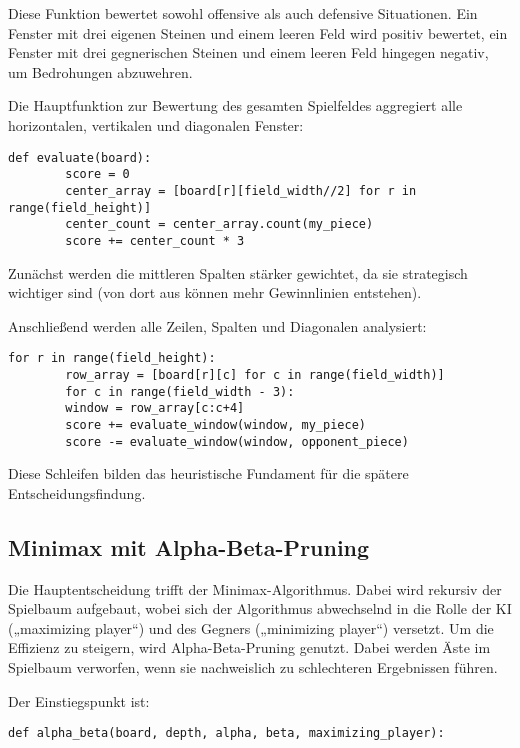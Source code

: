 	Diese Funktion bewertet sowohl offensive als auch defensive Situationen. Ein Fenster mit drei eigenen Steinen und einem leeren Feld wird positiv bewertet, ein Fenster mit drei gegnerischen Steinen und einem leeren Feld hingegen negativ, um Bedrohungen abzuwehren.
	
	Die Hauptfunktion zur Bewertung des gesamten Spielfeldes aggregiert alle horizontalen, vertikalen und diagonalen Fenster:
	
	\begin{lstlisting}[style=pythonstyle]
		def evaluate(board):
		score = 0
		center_array = [board[r][field_width//2] for r in range(field_height)]
		center_count = center_array.count(my_piece)
		score += center_count * 3
	\end{lstlisting}
	
	Zunächst werden die mittleren Spalten stärker gewichtet, da sie strategisch wichtiger sind (von dort aus können mehr Gewinnlinien entstehen).
	
	Anschließend werden alle Zeilen, Spalten und Diagonalen analysiert:
	
	\begin{lstlisting}[style=pythonstyle]
		for r in range(field_height):
		row_array = [board[r][c] for c in range(field_width)]
		for c in range(field_width - 3):
		window = row_array[c:c+4]
		score += evaluate_window(window, my_piece)
		score -= evaluate_window(window, opponent_piece)
	\end{lstlisting}
	
	Diese Schleifen bilden das heuristische Fundament für die spätere Entscheidungsfindung.
	
	\subsection*{Minimax mit Alpha-Beta-Pruning}
	
	Die Hauptentscheidung trifft der Minimax-Algorithmus. Dabei wird rekursiv der Spielbaum aufgebaut, wobei sich der Algorithmus abwechselnd in die Rolle der KI („maximizing player“) und des Gegners („minimizing player“) versetzt. Um die Effizienz zu steigern, wird Alpha-Beta-Pruning genutzt. Dabei werden Äste im Spielbaum verworfen, wenn sie nachweislich zu schlechteren Ergebnissen führen.
	
	Der Einstiegspunkt ist:
	
	\begin{lstlisting}[style=pythonstyle]
		def alpha_beta(board, depth, alpha, beta, maximizing_player):
	\end{lstlisting}
	
